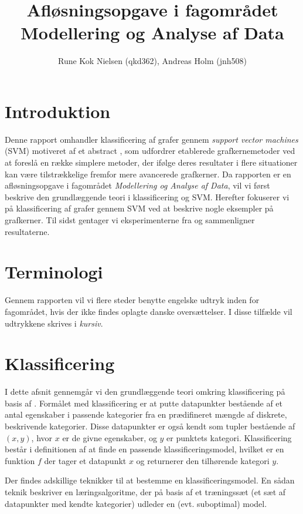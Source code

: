 \documentclass{article}
\author{Rune Kok Nielsen (qkd362), Andreas Holm (jnh508)}
\title{Afløsningsopgave i fagområdet Modellering og Analyse af Data}
\begin{document}
\maketitle

\newpage
\tableofcontents
\newpage

\section{Introduktion}
Denne rapport omhandler klassificering af grafer gennem \textit{support vector machines} (SVM) motiveret af et abstract \cite{trivial-kernels}, som udfordrer etablerede grafkernemetoder ved at foreslå en række simplere metoder, der ifølge deres resultater i flere situationer kan være tilstrækkelige fremfor mere avancerede grafkerner. Da rapporten er en afløsningsopgave i fagområdet \textit{Modellering og Analyse af Data}, vil vi først beskrive den grundlæggende teori i klassificering og SVM. Herefter fokuserer vi på klassificering af grafer gennem SVM ved at beskrive nogle eksempler på grafkerner. Til sidst gentager vi eksperimenterne fra \cite{trivial-kernels} og sammenligner resultaterne.

\section{Terminologi}
Gennem rapporten vil vi flere steder benytte engelske udtryk inden for fagområdet, hvis der ikke findes oplagte danske oversættelser. I disse tilfælde vil udtrykkene skrives i \textit{kursiv}.

\section{Klassificering}
I dette afsnit gennemgår vi den grundlæggende teori omkring klassificering på basis af \cite{data-mining}.
Formålet med klassificering er at putte datapunkter bestående af et antal egenskaber i passende kategorier fra en prædifineret mængde af diskrete, beskrivende kategorier. Disse datapunkter er også kendt som tupler bestående af $(x,y)$, hvor $x$ er de givne egenskaber, og $y$ er punktets kategori. Klassificering består i definitionen af at finde en passende klassificeringsmodel, hvilket er en funktion $f$ der tager et datapunkt $x$ og returnerer den tilhørende kategori $y$.

Der findes adskillige teknikker til at bestemme en klassificeringsmodel. En sådan teknik beskriver en læringsalgoritme, der på basis af et træningssæt (et sæt af datapunkter med kendte kategorier) udleder en (evt. suboptimal) model.
\end{document}
